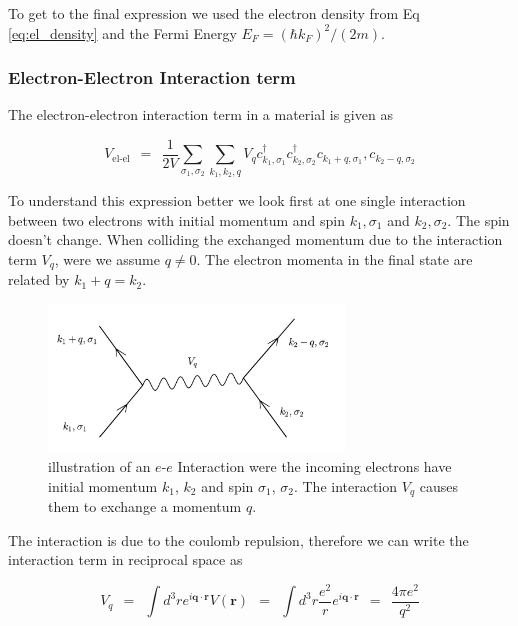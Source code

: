 \documentclass[10pt]{report}
\numberwithin{equation}{chapter}
\newcommand{\refEq}[1]{
  Eq  \ref{#1}
}
\begin{document}
To get to the final expression we used the electron density from \refEq{eq:el_density} and the Fermi Energy $E_F = (\hbar k_F)^2/(2m)$. 



\subsubsection{Electron-Electron Interaction term}

The electron-electron interaction term in a material is given as

\begin{equation}
  V_\text{el-el} ~~=~~ \frac{1}{2V} \sum_{\sigma_1, \sigma_2} \sum_{k_1, k_2, q} 
  V_q c^\dag_{k_1, \sigma_1} c^\dag_{k_2, \sigma_2} c_{k_1+q, \sigma_1}, c_{k_2-q, \sigma_2} 
\end{equation}


To understand this expression better we look first at one single interaction between two electrons with initial momentum and spin $k_1, \sigma_1$ and $k_2, \sigma_2$. The spin doesn't change. When colliding the exchanged momentum due to the interaction term $V_q$, were we assume $q \neq 0$. The electron momenta in the final state are related by $k_1 + q = k_2$.

\begin{figure}
  \centering
  \includegraphics[width=0.7\textwidth]{../img/sq_interaction.pdf}
  \caption{illustration of an $e$-$e$ Interaction were the incoming electrons have initial momentum $k_1$, $k_2$ and spin $\sigma_1$, $\sigma_2$. The interaction $V_q$ causes them to exchange a momentum $q$.}
\end{figure}


The interaction is due to the coulomb repulsion, therefore we can write the interaction term in reciprocal space as 

\begin{equation}
  V_q ~~=~~ \int d^3r e^{i\mathbf{q} \cdot \mathbf{r}} V(\mathbf{r}) 
  ~~=~~ \int d^3r \frac{e^2}{r} e^{i \mathbf{q} \cdot \mathbf{r}} 
  ~~=~~ \frac{4\pi e^2}{q^2}
\end{equation}
\end{document}
